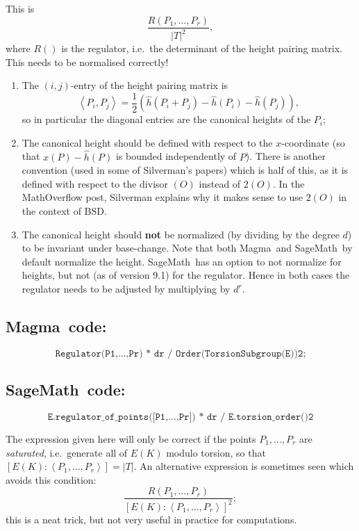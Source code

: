 \documentclass{amsart}
\newcommand{\software}[1]{\textsf{#1}} %
\newcommand{\Sage}{\software{SageMath}{}\ }
\newcommand{\Magma}{\software{Magma}{}\ }
\newcommand\hh{\hat{h}}
\begin{document}
This is \[\frac{R(P_1,\dots,P_r)}{|T|^2},\] where \(R()\) is the
regulator, i.e.~the determinant of the height pairing matrix. This needs
to be normalised correctly!

\begin{enumerate}
\item The \((i,j)\)-entry of the height pairing matrix is
  \[\left\langle P_i,P_j\right\rangle = \frac{1}{2}(\hh(P_i+P_j) - \hh(P_i) - \hh(P_j)),\]
  so in particular the diagonal entries are the canonical heights of the
\(P_i\);
\item The canonical height should be defined with respect to the
  \(x\)-coordinate (so that \(x(P)-\hh(P)\) is bounded independently
  of \(P\)). There is another convention (used in some of Silverman's
  papers) which is half of this, as it is defined with respect to the
  divisor \((O)\) instead of \(2(O)\). In the MathOverflow post,
  Silverman explains why it makes sense to use \(2(O)\) in the context
  of BSD.
\item The canonical height should \textbf{not} be normalized (by
  dividing by the degree \(d\)) to be invariant under
  base-change. Note that both \Magma and \Sage by default normalize
  the height. \Sage has an option to not normalize for heights, but
  not (as of version 9.1) for the regulator. Hence in both cases the
  regulator needs to be adjusted by multiplying by \(d^r\).
\end{enumerate}

\subsection{\Magma code:}\label{magma-3}

\[
\texttt{Regulator(P1,...,Pr)\ *\ d\^{}r\ /\ Order(TorsionSubgroup(E))\^{}2;}
\]

\subsection{\Sage code:}\label{sage-3}

\[
\texttt{E.regulator\_of\_points({[}P1,...,Pr{]})\ *\ d\^{}r\ /\ E.torsion\_order()\^{}2}
\]

The expression given here will only be correct if the points
\(P_1,\dots,P_r\) are \emph{saturated}, i.e.~generate all of \(E(K)\)
modulo torsion, so that
\([E(K):\left\langle P_1,\dots,P_r\right\rangle] = |T|\). An alternative
expression is sometimes seen which avoids this condition:
\[\frac{R(P_1,\dots,P_r)}{[E(K):\left\langle P_1,\dots,P_r\right\rangle]^2};\]
this is a neat trick, but not very useful in practice for computations.
\end{document}
